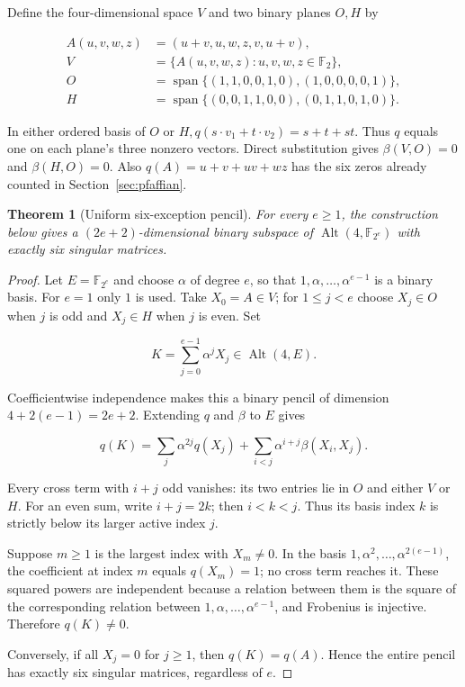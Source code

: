 \documentclass[11pt,a4paper]{article}
\newcommand{\F}{\mathbb F}
\DeclareMathOperator{\Alt}{Alt}
\newtheorem{theorem}{Theorem}
\theoremstyle{definition}
\begin{document}
Define the four-dimensional space $V$ and two binary planes $O,H$ by


\begin{equation}\label{eq:112}
\begin{aligned}A(u,v,w,z)&=(u+v,u,w,z,v,u+v),\\ V&=\{A(u,v,w,z):u,v,w,z\in\F_2\},\\O&=\operatorname{span}\{(1,1,0,0,1,0),(1,0,0,0,0,1)\},\\H&=\operatorname{span}\{(0,0,1,1,0,0),(0,1,1,0,1,0)\}.\end{aligned}
\end{equation}

In either ordered basis of $O$ or $H, q(s\cdot v_{1}+t\cdot v_{2})=s+t+st$. Thus $q$ equals one on each plane's three nonzero vectors. Direct substitution gives $\beta (V,O)=0$ and $\beta (H,O)=0$. Also $q(A)=u+v+uv+wz$ has the six zeros already counted in Section~\ref{sec:pfaffian}.


\begin{theorem}[Uniform six-exception pencil]\label{thm:pencil}For every $e\ge1$, the construction below gives a $(2e+2)$-dimensional binary subspace of $\Alt(4,\F_{2^e})$ with exactly six singular matrices.\end{theorem}\begin{proof}

Let $E=\F_{2^{e}}$ and choose $\alpha $ of degree $e$, so that $1,\alpha ,\ldots ,\alpha ^{e-1}$ is a binary basis. For $e=1$ only $1$ is used. Take $X_{0}=A\in V$; for $1\le j<e$ choose $X_{j}\in O$ when $j$ is odd and $X_{j}\in H$ when $j$ is even. Set


\begin{equation}\label{eq:116}
K=\sum_{j=0}^{e-1}\alpha^jX_j\in\Alt(4,E).
\end{equation}

Coefficientwise independence makes this a binary pencil of dimension $4+2(e-1)=2e+2$. Extending $q$ and $\beta $ to $E$ gives


\begin{equation}\label{eq:118}
q(K)=\sum_j\alpha^{2j}q(X_j)+\sum_{i<j}\alpha^{i+j}\beta(X_i,X_j).
\end{equation}

Every cross term with $i+j$ odd vanishes: its two entries lie in $O$ and either $V$ or $H$. For an even sum, write $i+j=2k$; then $i<k<j$. Thus its basis index $k$ is strictly below its larger active index $j$.


Suppose $m\ge 1$ is the largest index with $X_{m}\ne 0$. In the basis $1,\alpha ^{2},\ldots ,\alpha ^{2(e-1)}$, the coefficient at index $m$ equals $q(X_{m})=1$; no cross term reaches it. These squared powers are independent because a relation between them is the square of the corresponding relation between $1,\alpha ,\ldots ,\alpha ^{e-1}$, and Frobenius is injective. Therefore $q(K)\ne 0$.


Conversely, if all $X_{j}=0$ for $j\ge 1$, then $q(K)=q(A)$. Hence the entire pencil has exactly six singular matrices, regardless of $e$.


\end{proof}
\end{document}
